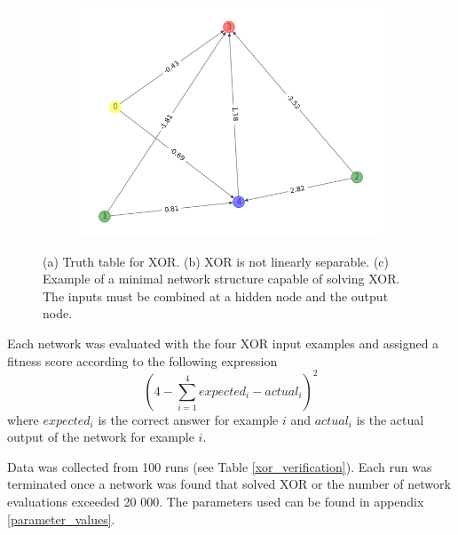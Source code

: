 \begin{figure}[h!]
    \begin{mdframed}
    \begin{subfigure}[t]{0.3\textwidth}
        
        \caption{}
    \end{subfigure}
    \begin{subfigure}[t]{0.3\textwidth}
        
        \caption{}
    \end{subfigure}
    \begin{subfigure}[t]{0.4\textwidth}
        \includegraphics[scale=0.3]{resources/tex/xor/xor_weights.png}
        \caption{}
    \end{subfigure}
    \end{mdframed}
    \caption{(a) Truth table for XOR. (b) XOR is not linearly separable.
    (c) Example of a minimal network structure capable of solving XOR. The inputs must be combined at a hidden node
    and the output node.}
    \label{xor}
\end{figure}


Each network was evaluated with the four XOR input examples and assigned a fitness score according to the following expression
\begin{equation*} \label{eq:2}
    (4 - \sum_{i=1}^{4} expected_{i} - actual_{i})^2
\end{equation*}
where $expected_{i}$ is the correct answer for example $i$ and $actual_{i}$ is the actual output of the network for example $i$.

Data was collected from 100 runs (see Table \ref{xor_verification}). Each run was terminated once a network was found that solved
XOR or the number of network evaluations exceeded 20 000. The parameters used can be found in appendix \ref{parameter_values}.

